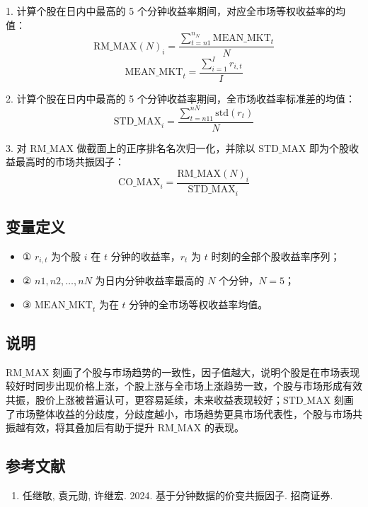 \documentclass{article}
\begin{document}
1. 计算个股在日内中最高的 5 个分钟收益率期间，对应全市场等权收益率的均值：
\begin{equation}
    \mathrm{RM\_MAX}(N)_i = \frac{\sum_{t=n1}^{n_N} \mathrm{MEAN\_MKT}_t}{N}
\end{equation}
\begin{equation}
    \mathrm{MEAN\_MKT}_t = \frac{\sum_{i=1}^I r_{i,t}}{I}
\end{equation}

2. 计算个股在日内中最高的 5 个分钟收益率期间，全市场收益率标准差的均值：
\begin{equation}
    \mathrm{STD\_MAX}_i = \frac{\sum_{t=n11}^{nN} \mathrm{std}(r_t)}{N}
\end{equation}

3. 对 \( \mathrm{RM\_MAX} \) 做截面上的正序排名名次归一化，并除以 \( \mathrm{STD\_MAX} \) 即为个股收益最高时的市场共振因子：
\begin{equation}
    \mathrm{CO\_MAX}_i = \frac{\mathrm{RM\_MAX}(N)_i}{\mathrm{STD\_MAX}_i}
\end{equation}

\subsection{变量定义}
\begin{itemize}
    \item ① \( r_{i,t} \) 为个股 \( i \) 在 \( t \) 分钟的收益率，\( r_t \) 为 \( t \) 时刻的全部个股收益率序列；
    \item ② \( n1, n2, \ldots, nN \) 为日内分钟收益率最高的 \( N \) 个分钟，\( N=5 \)；
    \item ③ \( \mathrm{MEAN\_MKT}_t \) 为在 \( t \) 分钟的全市场等权收益率均值。
\end{itemize}

\subsection{说明}
\( \mathrm{RM\_MAX} \) 刻画了个股与市场趋势的一致性，因子值越大，说明个股是在市场表现较好时同步出现价格上涨，个股上涨与全市场上涨趋势一致，个股与市场形成有效共振，股价上涨被普遍认可，更容易延续，未来收益表现较好；\( \mathrm{STD\_MAX} \) 刻画了市场整体收益的分歧度，分歧度越小，市场趋势更具市场代表性，个股与市场共振越有效，将其叠加后有助于提升 \( \mathrm{RM\_MAX} \) 的表现。

\subsection{参考文献}
\begin{enumerate}
    \item 任继敏, 袁元勋, 许继宏. 2024. 基于分钟数据的价变共振因子. 招商证券.
\end{enumerate}
\end{document}
